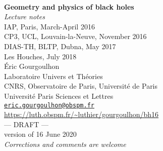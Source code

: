 \documentclass[12pt,a4paper]{book}
\begin{document}
\begin{titlepage}
\
\vspace{4cm}
\begin{center}
{\Huge\textbf{Geometry and physics of black holes}}\\[2ex]
{\Huge\emph{Lecture notes}}\\[3ex]
{\Large IAP, Paris, March-April 2016} \\[1ex]
{\Large CP3, UCL, Louvain-la-Neuve, November 2016}\\[1ex]
{\Large DIAS-TH, BLTP, Dubna, May 2017}\\[1ex]
{\Large Les Houches, July 2018}\\[8ex]
Éric Gourgoulhon \\
Laboratoire Univers et Théories \\
CNRS, Observatoire de Paris, Université de Paris\\
Université Paris Sciences et Lettres\\
\href{mailto:eric.gourgoulhon@obspm.fr}{\texttt{eric.gourgoulhon@obspm.fr}}\\[8ex]
\url{https://luth.obspm.fr/~luthier/gourgoulhon/bh16}\\[8ex]
{\Huge --- DRAFT ---}\\[2ex]
{version of 16 June 2020}\\[2ex]
\emph{\Large Corrections and comments are welcome}
\end{center}
\end{titlepage}


\dominitoc

\newpage


\tableofcontents








\end{document}
